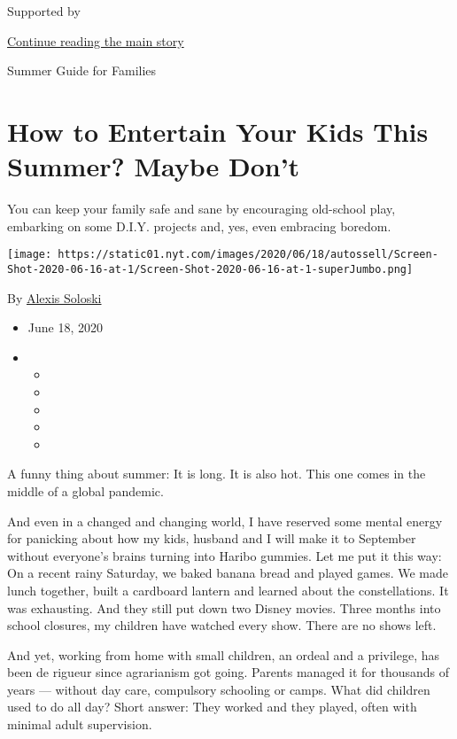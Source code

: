 Supported by

\protect\hyperlink{after-sponsor}{Continue reading the main story}

Summer Guide for Families

\hypertarget{how-to-entertain-your-kids-this-summer-maybe-dont}{%
\section{How to Entertain Your Kids This Summer? Maybe
Don't}\label{how-to-entertain-your-kids-this-summer-maybe-dont}}

You can keep your family safe and sane by encouraging old-school play,
embarking on some D.I.Y. projects and, yes, even embracing boredom.

\texttt{[image: https://static01.nyt.com/images/2020/06/18/autossell/Screen-Shot-2020-06-16-at-1/Screen-Shot-2020-06-16-at-1-superJumbo.png]}

By \href{https://www.nytimes.com/by/alexis-soloski}{Alexis Soloski}

\begin{itemize}
\item
  June 18, 2020
\item
  \begin{itemize}
  \item
  \item
  \item
  \item
  \item
  \end{itemize}
\end{itemize}

A funny thing about summer: It is long. It is also hot. This one comes
in the middle of a global pandemic.

And even in a changed and changing world, I have reserved some mental
energy for panicking about how my kids, husband and I will make it to
September without everyone's brains turning into Haribo gummies. Let me
put it this way: On a recent rainy Saturday, we baked banana bread and
played games. We made lunch together, built a cardboard lantern and
learned about the constellations. It was exhausting. And they still put
down two Disney movies. Three months into school closures, my children
have watched every show. There are no shows left.

And yet, working from home with small children, an ordeal and a
privilege, has been de rigueur since agrarianism got going. Parents
managed it for thousands of years --- without day care, compulsory
schooling or camps. What did children used to do all day? Short answer:
They worked and they played, often with minimal adult supervision.

